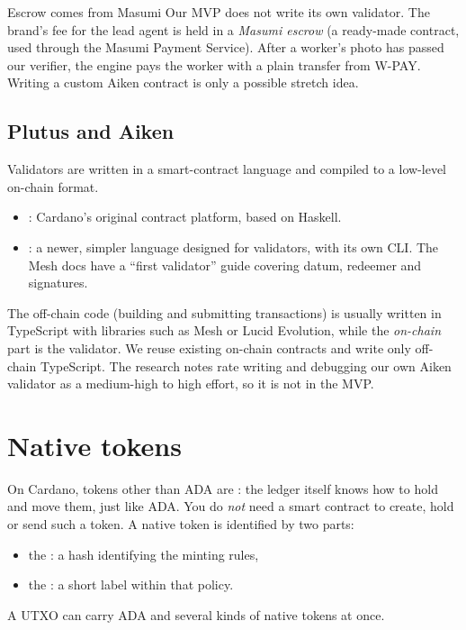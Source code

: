 \begin{shelfiebox}{Escrow comes from Masumi}
Our MVP does not write its own validator. The brand's fee for the lead agent is held in a \emph{Masumi escrow} (a ready-made contract, used through the Masumi Payment Service). After a worker's photo has passed our verifier, the engine pays the worker with a plain transfer from W-PAY. Writing a custom Aiken contract is only a possible stretch idea.
\end{shelfiebox}

\subsection{Plutus and Aiken}
Validators are written in a smart-contract language and compiled to a low-level on-chain format.
\begin{itemize}
  \item {}: Cardano's original contract platform, based on Haskell.
  \item {}: a newer, simpler language designed for validators, with its own CLI. The Mesh docs have a ``first validator'' guide covering datum, redeemer and signatures.
\end{itemize}
The off-chain code (building and submitting transactions) is usually written in TypeScript with libraries such as Mesh or Lucid Evolution, while the \emph{on-chain} part is the validator. We reuse existing on-chain contracts and write only off-chain TypeScript. The research notes rate writing and debugging our own Aiken validator as a medium-high to high effort, so it is not in the MVP.

\section{Native tokens}

On Cardano, tokens other than ADA are : the ledger itself knows how to hold and move them, just like ADA. You do \emph{not} need a smart contract to create, hold or send such a token. A native token is identified by two parts:
\begin{itemize}
  \item the : a hash identifying the minting rules,
  \item the : a short label within that policy.
\end{itemize}
A UTXO can carry ADA and several kinds of native tokens at once.

